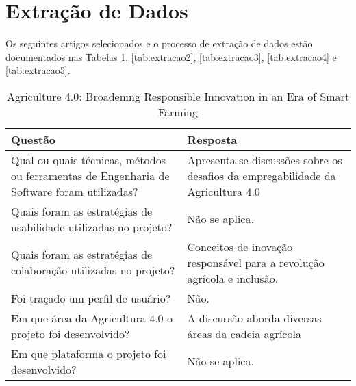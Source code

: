 \documentclass[12pt]{article}
\begin{document}
\section{Extração de Dados}

Os seguintes artigos selecionados e o processo de extração de dados estão documentados nas Tabelas \ref{tab:extracao1}, \ref{tab:extracao2}, \ref{tab:extracao3}, \ref{tab:extracao4} e \ref{tab:extracao5}.

\begin{table}[!htb]
	\footnotesize
  \centering
	\begin{tabular}{|p{8cm}|p{6cm}|}
		\hline
		\textbf{Questão}                                                                           & \textbf{Resposta}                                                      \\ \hline
		Qual ou quais técnicas, métodos ou ferramentas de Engenharia de Software foram utilizadas? & Apresenta-se discussões sobre os desafios da empregabilidade da Agricultura 4.0 \\ \hline
		Quais foram as estratégias de usabilidade utilizadas no projeto?                           & Não se aplica.                                 \\ \hline
		Quais foram as estratégias de colaboração utilizadas no projeto?                           & Conceitos de inovação responsável para a revolução agrícola e inclusão.                                 \\ \hline
		Foi traçado um perfil de usuário?                                                          & Não.                                                                \\ \hline
		Em que área da Agricultura 4.0 o projeto foi desenvolvido?                                 & A discussão aborda diversas áreas da cadeia agrícola                                    \\ \hline
		Em que plataforma o projeto foi desenvolvido?                                              & Não se aplica.                                \\ \hline
		\end{tabular}
  \caption{Agriculture 4.0: Broadening Responsible Innovation in an Era of Smart Farming}
  \label{tab:extracao1}
\end{table}
\end{document}
